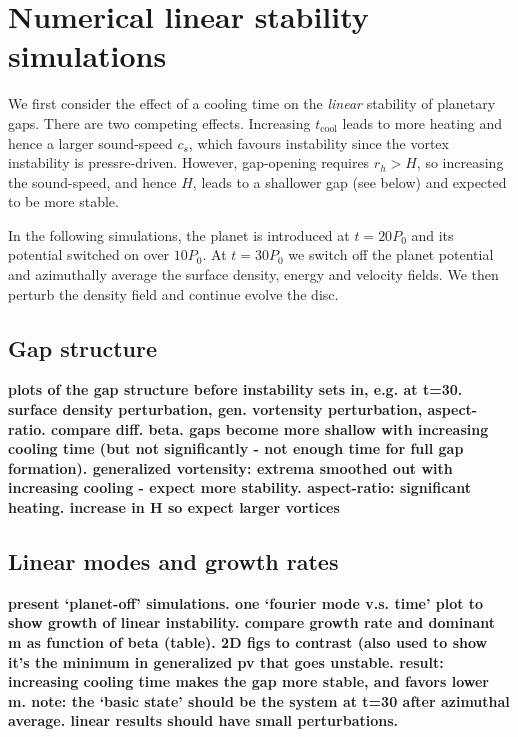 \section{Numerical linear stability simulations}
We first consider the effect of a cooling time on the \emph{linear} stability
of planetary gaps. There are two competing effects. Increasing
$t_\mathrm{cool}$ leads to more heating and hence a larger sound-speed
$c_s$, which favours instability \citep{li00} since the vortex
instability is pressre-driven. However, gap-opening requires $r_h>H$,
so increasing the sound-speed, and hence $H$, leads to a shallower
gap (see below) and expected to be more stable. 

In the following simulations, the planet is introduced at $t=20P_0$ and
its potential switched on over $10P_0$. At $t=30P_0$ we switch off the
planet potential and azimuthally average the surface density, energy
and velocity fields. We then perturb the density field and continue
evolve the disc. %

\subsection{Gap structure}
{\bf plots of the gap structure before instability sets in, e.g. at
  t=30. surface density perturbation, gen. vortensity perturbation,
  aspect-ratio. compare diff. beta. gaps become more shallow with
  increasing cooling time (but not significantly - not enough time for
  full gap formation). generalized vortensity: extrema smoothed out
  with increasing cooling - expect more stability. aspect-ratio:
  significant heating. increase in H so expect larger vortices
}

\subsection{Linear modes and growth rates}
{\bf present `planet-off' simulations. one `fourier mode v.s. time'
  plot to show growth of linear instability. 
  compare growth rate and dominant
  m as function of beta (table). 2D figs to contrast (also used to
  show it's the minimum in generalized pv that goes unstable.    
  result: increasing cooling time makes the gap
  more stable, and favors lower m. note: the `basic state' should be
  the system at t=30 after azimuthal average. linear results should
  have small perturbations. 
}

